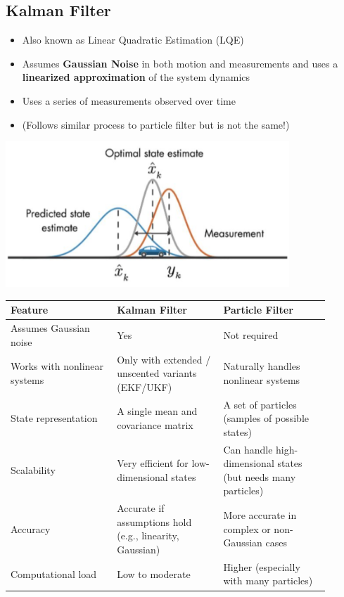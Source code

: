 \documentclass[10pt]{article}
\begin{document}
\subsection*{Kalman Filter}
\begin{itemize}
	\item Also known as Linear Quadratic Estimation (LQE)
	\item Assumes \textbf{Gaussian Noise} in both motion and measurements and uses a \textbf{linearized approximation} of the system dynamics
	\item Uses a series of measurements observed over time
	\item (Follows similar process to particle filter but is not the same!)
\end{itemize}
\begin{center} 
	\includegraphics*[width=0.8\textwidth]{L2_10.png} 
\end{center}

\begin{center}
\begin{tabular}{|p{0.3\linewidth}|p{0.3\linewidth}|p{0.3\linewidth}|}
    \hline
    \textbf{Feature} & \textbf{Kalman Filter} & \textbf{Particle Filter} \\
    \hline
    Assumes Gaussian noise & Yes & Not required \\
    \hline
    Works with nonlinear systems & Only with extended / unscented variants (EKF/UKF) & Naturally handles nonlinear systems \\
    \hline
    State representation & A single mean and covariance matrix & A set of particles (samples of possible states)\\
    \hline
    Scalability & Very efficient for low-dimensional states & Can handle high-dimensional states (but needs many particles) \\
    \hline
    Accuracy & Accurate if assumptions hold (e.g., linearity, Gaussian) & More accurate in complex or non-Gaussian cases \\
    \hline
    Computational load & Low to moderate & Higher (especially with many particles)\\
    \hline
\end{tabular}
\end{center}
\end{document}
